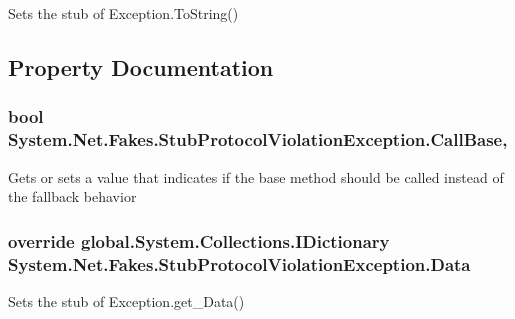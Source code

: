 Sets the stub of Exception.\-To\-String()



\subsection{Property Documentation}
\hypertarget{class_system_1_1_net_1_1_fakes_1_1_stub_protocol_violation_exception_a078433e9163618b8d56e4db206c6fecf}{
\subsubsection[{Call\-Base}]{\setlength{\rightskip}{0pt plus 5cm}bool System.\-Net.\-Fakes.\-Stub\-Protocol\-Violation\-Exception.\-Call\-Base\hspace{0.3cm}{\ttfamily [get]}, {\ttfamily [set]}}}\label{class_system_1_1_net_1_1_fakes_1_1_stub_protocol_violation_exception_a078433e9163618b8d56e4db206c6fecf}


Gets or sets a value that indicates if the base method should be called instead of the fallback behavior

\hypertarget{class_system_1_1_net_1_1_fakes_1_1_stub_protocol_violation_exception_aec9589c991f4c774121cd0c3d0b9fedc}{
\subsubsection[{Data}]{\setlength{\rightskip}{0pt plus 5cm}override global.\-System.\-Collections.\-I\-Dictionary System.\-Net.\-Fakes.\-Stub\-Protocol\-Violation\-Exception.\-Data\hspace{0.3cm}{\ttfamily [get]}}}\label{class_system_1_1_net_1_1_fakes_1_1_stub_protocol_violation_exception_aec9589c991f4c774121cd0c3d0b9fedc}


Sets the stub of Exception.\-get\-\_\-\-Data()


